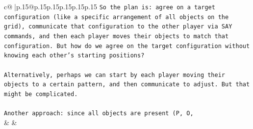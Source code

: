 \documentclass{article}
\begin{document}
{\begin{supertabular}{c@{$\;$}|p{.15\linewidth}@{}p{.15\linewidth}p{.15\linewidth}p{.15\linewidth}p{.15\linewidth}p{.15\linewidth}}
{{{\texttt{So the plan is: agree on a target configuration (like a specific arrangement of all objects on the grid), communicate that configuration to the other player via SAY commands, and then each player moves their objects to match that configuration. But how do we agree on the target configuration without knowing each other's starting positions?} \\
\\ 
\texttt{Alternatively, perhaps we can start by each player moving their objects to a certain pattern, and then communicate to adjust. But that might be complicated.} \\
\\ 
\texttt{Another approach: since all objects are present (P, O,} \\
            }
        }
    }
    & & \\ \\


\end{supertabular}}
\end{document}
